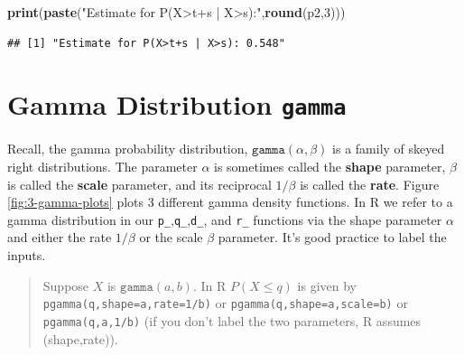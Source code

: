 \documentclass[
]{book}
\newenvironment{Shaded}{\begin{snugshade}}{\end{snugshade}}
\newcommand{\DecValTok}[1]{\textcolor[rgb]{0.00,0.00,0.81}{#1}}
\newcommand{\FunctionTok}[1]{\textcolor[rgb]{0.13,0.29,0.53}{\textbf{#1}}}
\newcommand{\NormalTok}[1]{#1}
\newcommand{\StringTok}[1]{\textcolor[rgb]{0.31,0.60,0.02}{#1}}
\theoremstyle{definition}
\theoremstyle{definition}
\theoremstyle{definition}
\theoremstyle{definition}
\theoremstyle{remark}
\begin{document}
\begin{Shaded}
\begin{Highlighting}[]
\FunctionTok{print}\NormalTok{(}\FunctionTok{paste}\NormalTok{(}\StringTok{"Estimate for P(X\textgreater{}t+s | X\textgreater{}s):"}\NormalTok{,}\FunctionTok{round}\NormalTok{(p2,}\DecValTok{3}\NormalTok{)))}
\end{Highlighting}
\end{Shaded}

\begin{verbatim}
## [1] "Estimate for P(X>t+s | X>s): 0.548"
\end{verbatim}

\section{\texorpdfstring{Gamma Distribution \texttt{gamma}}{Gamma Distribution gamma}}\label{gammaR}

Recall, the gamma probability distribution, \(\texttt{gamma}(\alpha,\beta)\) is a family of skeyed right distributions. The parameter \(\alpha\) is sometimes called the \textbf{shape} parameter, \(\beta\) is called the \textbf{scale} parameter, and its reciprocal \(1/\beta\) is called the \textbf{rate}. Figure \ref{fig:3-gamma-plots} plots 3 different gamma density functions. In R we refer to a gamma distribution in our \texttt{p\_},\texttt{q\_},\texttt{d\_}, and \texttt{r\_} functions via the shape parameter \(\alpha\) and either the rate \(1/\beta\) or the scale \(\beta\) parameter. It's good practice to label the inputs.

\begin{quote}
Suppose \(X\) is \(\texttt{gamma}(a,b)\). In R \(P(X \leq q)\) is given by \texttt{pgamma(q,shape=a,rate=1/b)} or \texttt{pgamma(q,shape=a,scale=b)} or \texttt{pgamma(q,a,1/b)} (if you don't label the two parameters, R assumes (shape,rate)).
\end{quote}
\end{document}
